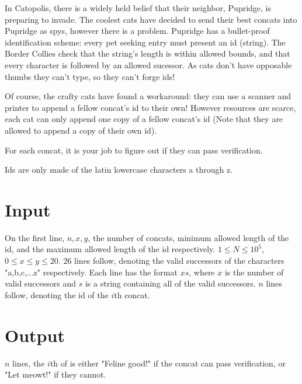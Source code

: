 
In Catopolis, there is a widely held belief that their neighbor, Pupridge, is preparing to invade. The coolest cats have decided to send their best concats into Pupridge as spys, however there is a problem. Pupridge has a bullet-proof identification scheme: every pet seeking entry must present an id (string). The Border Collies check that the string's length is within allowed bounds, and that every character is followed by an allowed sucessor. As cats don't have opposable thumbs they can't type, so they can't forge ids!

\medskip

Of course, the crafty cats have found a workaround: they can use a scanner and printer to append a fellow concat's id to their own! However resources are scarce, each cat can only append one copy of a fellow concat's id (Note that they are allowed to append a copy of their own id).

\medskip

For each concat, it is your job to figure out if they can pass verification.

Ids are only made of the latin lowercase characters a through z.

\section*{Input}
On the first line, $n, x, y$, the number of concats, minimum allowed length of the id, and the maximum allowed length of the id respectively. $1 \leq N \leq 10^5$, $0 \leq x \leq y \leq 20$.
26 lines follow, denoting the valid successors of the characters "a,b,c,...z" respectively. Each line has the format $x s$, where $x$ is the number of valid successors and $s$ is a string containing all of the valid successors.
$n$ lines follow, denoting the id of the $i$th concat.

\section*{Output}
$n$ lines, the $i$th of is either "Feline good!" if the concat can pass verification, or "Let meowt!" if they cannot.
